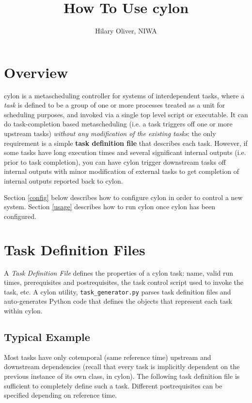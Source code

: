 \documentclass[11pt,a4paper]{article}
\title{How To Use cylon}
\author{Hilary Oliver, NIWA}
\begin{document}
\maketitle
\tableofcontents

\section{Overview}

cylon is a metascheduling controller for systems of interdependent
tasks, where a {\em task} is defined to be a group of one or more
processes treated as a unit for scheduling purposes, and invoked via a
single top level script or executable.  It can do task-completion based
metascheduling (i.e. a task triggers off  one or more
upstream tasks) {\em without any modification of the existing tasks}:
the only requirement is a simple \textbf{task definition file} that
describes each task. However, if some tasks have long execution times
and several significant internal outputs (i.e. prior to task
completion), you can have cylon trigger downstream tasks off internal
outputs with minor modification of external tasks to get completion of
internal outputs reported back to cylon. 

Section \ref{config} below describes how to configure cylon in order to
control a new system.  Section \ref{usage} describes how to run cylon
once cylon has been configured.

\label{config}
\section{Task Definition Files}

A {\em Task Definition File} defines the properties of a cylon task:
name, valid run times, prerequisites and postrequisites, the task
control script used to invoke the task, etc.  A cylon utility,
\verb=task_generator.py= parses task definition files and auto-generates
Python code that defines the objects that represent each task within
cylon.

\subsection{Typical Example}

Most tasks have only cotemporal (same reference time) upstream and
downstream dependencies (recall that every task is implicitly dependent
on the previous instance of its own class, in cylon). The following
task definition file is sufficient to completely define such a task.
Different postrequisites can be specified depending on reference time. 
\end{document}

